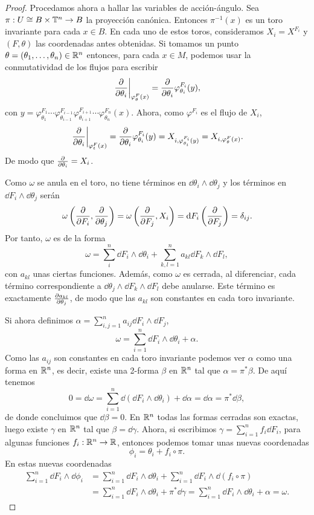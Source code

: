 \begin{proof}
 Procedamos ahora a hallar las variables de acción-ángulo. Sea $\pi:U\cong B\times \mathbb{T}^n\rightarrow B$ la proyección canónica. Entonces $\pi^{-1}(x)$ es un toro invariante para cada $x \in B$. En cada uno de estos toros, consideramos $X_i=X^{F_i}$ y $(F,\theta)$ las coordenadas antes obtenidas. Si tomamos un punto $\theta=(\theta_1,\dots,\theta_n)\in \mathbb{R}^n$ entonces, para cada $x\in M$, podemos usar la conmutatividad de los flujos para escribir
\[
  \left. \frac{\partial}{\partial \theta_i}\right|_{\varphi^F_{\theta}(x)} = \frac{\partial}{\partial \theta_i} \varphi^{F_i}_{\theta_i}(y),
\]
con $y=\varphi^{F_1}_{\theta_1}\cdots\varphi^{F_{i-1}}_{\theta_{i-1}}\varphi^{F_{i+1}}_{\theta_{i+1}}\cdots\varphi^{F_{n}}_{\theta_{n}}(x)$. Ahora, como $\varphi^{F_i}$ es el flujo de $X_i$,
\begin{equation*}
  \left. \frac{\partial}{\partial \theta_i}\right|_{\varphi^F_t(x)} = \frac{\partial}{\partial \theta_i} \varphi^{F_i}_{\theta_i}(y)=X_{i, \varphi^{F_i}_{\theta_i}(y)}=X_{i,\varphi^F_{\theta}(x)}.
\end{equation*}
De modo que $\frac{\partial}{\partial \theta_i}=X_i$.

Como $\omega$ se anula en el toro, no tiene términos en $\dd \theta_i \wedge \dd \theta_j$ y los términos en $\dd F_i \wedge \dd \theta_j$ serán
\[
  \omega\left(\frac{\partial}{\partial F_i},\frac{\partial}{\partial \theta_j}\right)=\omega\left(\frac{\partial}{\partial F_j},X_i\right)=\mathrm{d} F_i\left(\frac{\partial}{\partial F_j}\right)=\delta_{ij}.
\]
Por tanto, $\omega$ es de la forma
\[
  \omega = \sum_{i}^n  \dd F_i \wedge \dd \theta_i + \sum_{k,l=1}^n a_{kl} \dd F_k \wedge \dd F_l,
\]
con $a_{kl}$ unas ciertas funciones. Además, como $\omega$ es cerrada, al diferenciar, cada término correspondiente a $\dd \theta_j \wedge \dd F_k \wedge \dd F_l$ debe anularse. Este término es exactamente
  $\frac{\partial a_{kl}}{\partial \theta_j}$,
de modo que las $a_{kl}$ son constantes en cada toro invariante.

Si ahora definimos $\alpha=\sum_{i,j=1}^n a_{ij}\dd F_i \wedge \dd F_j$,
\[
  \omega=\sum_{i=1}^n \dd F_i \wedge \dd \theta_i + \alpha.
\]
Como las $a_{ij}$ son constantes en cada toro invariante podemos ver $\alpha$ como  una forma en $\mathbb{R}^n$, es decir, existe una 2-forma $\beta$ en $\mathbb{R}^n$ tal que
  $\alpha=\pi^* \beta$.
De aquí tenemos
\[
  0=\dd \omega= \sum_{i=1}^n \dd(\dd F_i \wedge \dd \theta_i) + \dd \alpha= \dd \alpha = \pi^* \dd \beta,
\]
de donde concluimos que $\dd \beta =0$. En $\mathbb{R}^n$ todas las formas cerradas son exactas, luego existe $\gamma$ en $\mathbb{R}^n$ tal que $\beta= \dd \gamma$.
Ahora, si escribimos $\gamma= \sum_{i=1}^n f_i \dd F_i$, para algunas funciones $f_i:\mathbb{R}^n \rightarrow \mathbb{R}$, entonces podemos tomar unas nuevas coordenadas 
\[
  \phi_i= \theta_i + f_i \circ \pi.
\]
En estas nuevas coordenadas
\[
\begin{split}
  \sum_{i=1}^n \dd F_i \wedge \dd \phi_i & = \sum_{i=1}^n \dd F_i \wedge \dd \theta_i + \sum_{i=1}^n \dd F_i \wedge \dd(f_i \circ \pi)  \\
   & =\sum_{i=1}^n \dd F_i \wedge \dd \theta_i + \pi^* \dd \gamma = \sum_{i=1}^n \dd F_i \wedge \dd \theta_i + \alpha = \omega.
\end{split}
\]


\end{proof}
